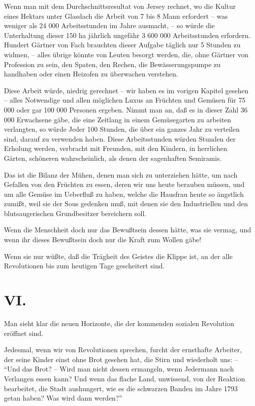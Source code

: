 \documentclass{scrbook}
\begin{document}
Wenn man mit dem Durchschnittsresultat von Jersey rechnet, wo die Kultur eines Hektars unter Glasdach die Arbeit von 7 bis 8 Mann erfordert – was weniger als 24 000 Arbeitsstunden im Jahre ausmacht, – so würde die Unterhaltung dieser 150 ha jährlich ungefähr 3 600 000 Arbeitsstunden erfordern. Hundert Gärtner von Fach brauchten dieser Aufgabe täglich nur 5 Stunden zu widmen, – alles übrige könnte von Leuten besorgt werden, die, ohne Gärtner von Profession zu sein, den Spaten, den Rechen, die Bewässerungspumpe zu handhaben oder einen Heizofen zu überwachen verstehen.

Diese Arbeit würde, niedrig gerechnet – wir haben es im vorigen Kapitel gesehen – alles Notwendige und allen möglichen Luxus an Früchten und Gemüsen für 75 000 oder gar 100 000 Personen ergeben. Nimmt man an, daß es in dieser Zahl 36 000 Erwachsene gäbe, die eine Zeitlang in einem Gemüsegarten zu arbeiten verlangten, so würde Jeder 100 Stunden, die über ein ganzes Jahr zu verteilen sind, darauf zu verwenden haben. Diese Arbeitsstunden würden Stunden der Erholung werden, verbracht mit Freunden, mit den Kindern, in herrlichen Gärten, schöneren wahrscheinlich, als denen der sagenhaften Semiramis.

Das ist die Bilanz der Mühen, denen man sich zu unterziehen hätte, um nach Gefallen von den Früchten zu essen, deren wir uns heute berauben müssen, und um alle Gemüse im Ueberfluß zu haben, welche die Hausfrau heute so ängstlich zumißt, weil sie der Sous gedenken muß, mit denen sie den Industriellen und den blutsaugerischen Grundbesitzer bereichern soll.

Wenn die Menschheit doch nur das Bewußtsein dessen hätte, was sie vermag, und wenn ihr dieses Bewußtsein doch nur die Kraft zum Wollen gäbe!

Wenn sie nur wüßte, daß die Trägheit des Geistes die Klippe ist, an der alle Revolutionen bis zum heutigen Tage gescheitert sind.

\section*{VI.}

Man sieht klar die neuen Horizonte, die der kommenden sozialen Revolution eröffnet sind.

Jedesmal, wenn wir von Revolutionen sprechen, furcht der ernsthafte Arbeiter, der seine Kinder einst ohne Brot gesehen hat, die Stirn und wiederholt uns: – ``Und das Brot? – Wird man nicht dessen ermangeln, wenn Jedermann nach Verlangen essen kann? Und wenn das flache Land, unwissend, von der Reaktion bearbeitet, die Stadt aushungert, wie es die schwarzen Banden im Jahre 1793 getan haben? Was wird dann werden?''
\end{document}
